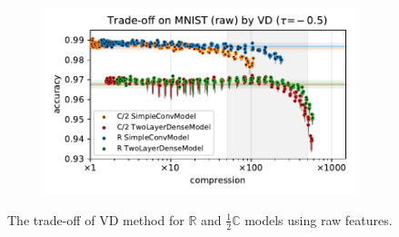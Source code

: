 \documentclass[a4paper,10pt,onecolumn]{article}
\newcommand{\real}{\mathbb{R}}
\newcommand{\cplx}{\mathbb{C}}
\begin{document}
\begin{figure}[b]
\begin{subfigure}[b]{0.5\columnwidth}
  \end{subfigure}%
  \begin{subfigure}[b]{0.5\columnwidth}
    \centering
    \includegraphics[width=\linewidth]{figure__mnist-like__trade-off/appendix__cmp__VD__mnist__raw__-0.5.pdf}
  \end{subfigure}
  \caption{%
    The trade-off of VD method for $\real$ and $\tfrac12\cplx$ models using raw features.
  }
  \label{fig:appendix__cmp__mnist-like__trade-off__VD__raw}
\end{figure}
\end{document}
